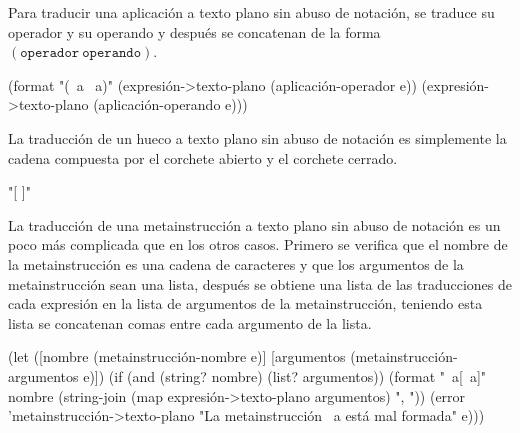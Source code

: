 Para traducir una aplicación a texto plano sin abuso de notación, se traduce su operador y su operando y después se concatenan de la forma \( (\mathtt{operador}\ \mathtt{operando}) \).

\nwenddocs{}\endmoddef
(format "(~a ~a)"
        (expresión->texto-plano (aplicación-operador e))
        (expresión->texto-plano (aplicación-operando e)))
\nwendcode{}\nwdocspar

La traducción de un hueco a texto plano sin abuso de notación es simplemente la cadena compuesta por el corchete abierto y el corchete cerrado.

\nwenddocs{}\endmoddef
"[ ]"
\nwendcode{}\nwdocspar

La traducción de una metainstrucción a texto plano sin abuso de notación es un poco más complicada que en los otros casos. Primero se verifica que el nombre de la metainstrucción es una cadena de caracteres y que los argumentos de la metainstrucción sean una lista, después se obtiene una lista de las traducciones de cada expresión en la lista de argumentos de la metainstrucción, teniendo esta lista se concatenan comas entre cada argumento de la lista.

\nwenddocs{}\endmoddef
(let ([nombre     (metainstrucción-nombre     e)]
      [argumentos (metainstrucción-argumentos e)])
  (if (and (string? nombre) (list? argumentos))
      (format "~a[~a]"
              nombre
              (string-join (map expresión->texto-plano argumentos) ", "))
      (error 'metainstrucción->texto-plano
             "La metainstrucción ~a está mal formada" e)))
\nwendcode{}\nwdocspar

